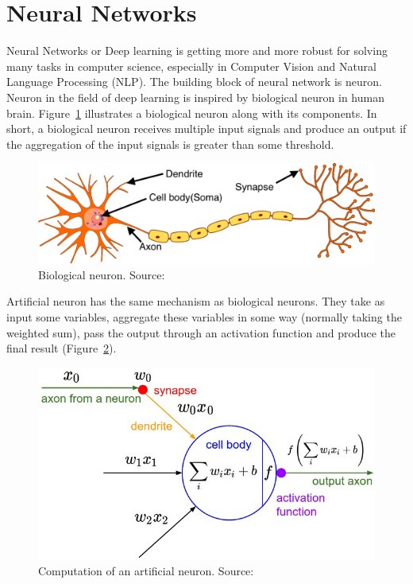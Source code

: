 \documentclass[12pt, sort&compress]{report}
\begin{document}
\section{Neural Networks}
\label{sec:2.1}
Neural Networks or Deep learning is getting more and more robust for solving many tasks in computer science, especially in Computer Vision and Natural Language Processing (NLP). The building block of neural network is neuron. Neuron in the field of deep learning is inspired by biological neuron in human brain. Figure~\ref{fig:2:01} illustrates a biological neuron along with its components. In short, a biological neuron receives multiple input signals and produce an output if the aggregation of the input signals is greater than some threshold. 
\begin{figure}[!htbp]
	\centering
	\includegraphics[scale=.25]{images/biological_neuron.png}
	\caption{Biological neuron. Source: \cite{saurabh2021}}
	\label{fig:2:01}
\end{figure}
\par Artificial neuron has the same mechanism as biological neurons. They take as input  some variables, aggregate these variables in some way (normally taking the weighted sum), pass the output through an activation function and produce the final result (Figure~\ref{fig:2:02}).
\begin{figure}[!htbp]
	\centering
	\includegraphics[scale=0.4]{images/activation.jpg}
	\caption{Computation of an artificial neuron. Source: \cite{online}}
	\label{fig:2:02}
\end{figure}
\end{document}
